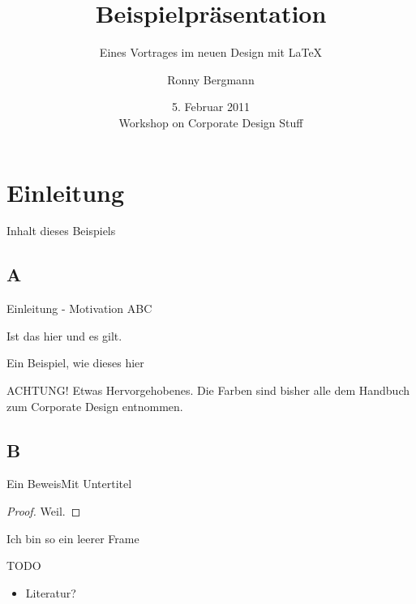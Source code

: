 \documentclass[german,10pt,xcolor=colortbl,compress
]{beamer}
\title{Beispielpräsentation}
\subtitle{Eines Vortrages im neuen Design mit \LaTeX}
\date[]{5. Februar 2011\\[1ex] Workshop on Corporate Design Stuff}
\author[R. Bergmann]{Ronny Bergmann}
\institute[Universität zu Lübeck]{Institut für Mathematik\\Universität zu Lübeck}
\begin{document}
	\maketitle	
	\section{Einleitung}
	\begin{frame}{Inhalt dieses Beispiels}
		\tableofcontents
	\end{frame}
	\subsection{A}
	\begin{frame}{Einleitung - Motivation}
	ABC
	\begin{lemma}
		Ist das hier und es gilt.
	\end{lemma}
	\begin{example}
		Ein Beispiel, wie dieses hier
	\end{example}
	\alert{ACHTUNG!}
		Etwas Hervorgehobenes. Die Farben sind bisher alle dem Handbuch zum Corporate Design entnommen.
	\end{frame}
	\subsection{B}
	\begin{frame}{Ein Beweis}{Mit Untertitel}
			\begin{proof}
				Weil.
			\end{proof}
	\end{frame}
	\begin{frame}[plain]{}{}%
		Ich bin so ein leerer Frame
	\end{frame}
	
	\begin{frame}{TODO}
		\begin{itemize}
			\item Literatur?
		\end{itemize}
	\end{frame}
\end{document}
